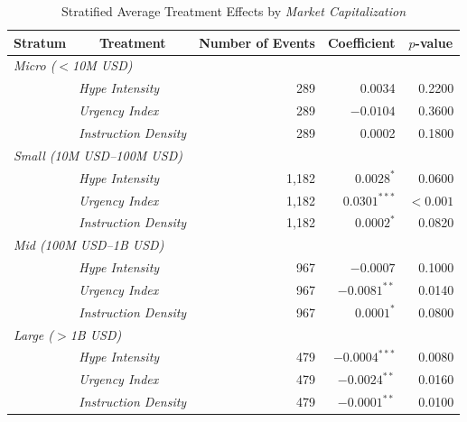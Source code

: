 \begin{table}[H]
\centering
\caption{Stratified Average Treatment Effects by \textit{Market Capitalization}}
\label{tab:stratified-ate-results}
\small
\begin{tabular}{|l|l|r|r|r|}
\toprule
\multicolumn{1}{|c|}{\textbf{Stratum}} & \multicolumn{1}{c|}{\textbf{Treatment}} & \multicolumn{1}{c|}{\textbf{Number of Events}} & \multicolumn{1}{c|}{\textbf{Coefficient}} & \multicolumn{1}{c|}{\textbf{$p$-value}} \\
\midrule
\multicolumn{5}{|l|}{\textit{Micro ($<$10M USD)}} \\
 & \textit{Hype Intensity} & 289 & 0.0034 & 0.2200 \\
 & \textit{Urgency Index} & 289 & $-0.0104$ & 0.3600 \\
 & \textit{Instruction Density} & 289 & 0.0002 & 0.1800 \\
\midrule
\multicolumn{5}{|l|}{\textit{Small (10M USD--100M USD)}} \\
 & \textit{Hype Intensity} & 1,182 & $0.0028^{*}$ & 0.0600 \\
 & \textit{Urgency Index} & 1,182 & $0.0301^{***}$ & $<0.001$ \\
 & \textit{Instruction Density} & 1,182 & $0.0002^{*}$ & 0.0820 \\
\midrule
\multicolumn{5}{|l|}{\textit{Mid (100M USD--1B USD)}} \\
 & \textit{Hype Intensity} & 967 & $-0.0007$ & 0.1000 \\
 & \textit{Urgency Index} & 967 & $-0.0081^{**}$ & 0.0140 \\
 & \textit{Instruction Density} & 967 & $0.0001^{*}$ & 0.0800 \\
\midrule
\multicolumn{5}{|l|}{\textit{Large ($>$1B USD)}} \\
 & \textit{Hype Intensity} & 479 & $-0.0004^{***}$ & 0.0080 \\
 & \textit{Urgency Index} & 479 & $-0.0024^{**}$ & 0.0160 \\
 & \textit{Instruction Density} & 479 & $-0.0001^{**}$ & 0.0100 \\
\bottomrule
\end{tabular}

\end{table}

